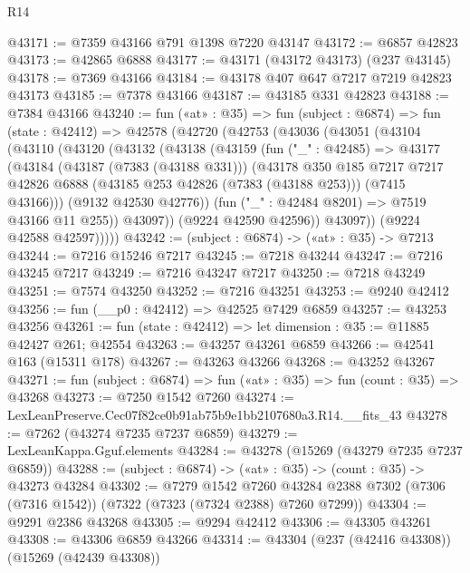 \begin{lexlean}{R14}
\begin{coremodule}
@43171 := @7359 @43166 @791 @1398 @7220 @43147
@43172 := @6857 @42823
@43173 := @42865 @6888
@43177 := @43171 (@43172 @43173) (@237 @43145)
@43178 := @7369 @43166
@43184 := @43178 @407 @647 @7217 @7219 @42823 @43173
@43185 := @7378 @43166
@43187 := @43185 @331 @42823
@43188 := @7384 @43166
@43240 := fun («at» : @35) =>
  fun (subject : @6874) =>
  fun (state : @42412) =>
  @42578
    (@42720
      (@42753
        (@43036
          (@43051
            (@43104
              (@43110
                (@43120
                  (@43132
                    (@43138
                      (@43159
                        (fun ("_" : @42485) =>
                        @43177
                          (@43184
                            (@43187 (@7383 (@43188 @331)))
                            (@43178
                              @350
                              @185
                              @7217
                              @7217
                              @42826
                              @6888
                              (@43185 @253 @42826 (@7383 (@43188 @253)))
                              (@7415 @43166)))
                          (@9132 @42530 @42776))
                        (fun ("_" : @42484 @8201) => @7519 @43166 @11 @255))
                      @43097))
                  (@9224 @42590 @42596))
                @43097))
            (@9224 @42588 @42597)))))
@43242 := (subject : @6874) -> («at» : @35) -> @7213
@43244 := @7216 @15246 @7217
@43245 := @7218 @43244
@43247 := @7216 @43245 @7217
@43249 := @7216 @43247 @7217
@43250 := @7218 @43249
@43251 := @7574 @43250
@43252 := @7216 @43251
@43253 := @9240 @42412
@43256 := fun (__p0 : @42412) => @42525 @7429 @6859
@43257 := @43253 @43256
@43261 := fun (state : @42412) => let dimension : @35 := @11885 @42427 @261; @42554
@43263 := @43257 @43261 @6859
@43266 := @42541 @163 (@15311 @178)
@43267 := @43263 @43266
@43268 := @43252 @43267
@43271 := fun (subject : @6874) => fun («at» : @35) => fun (count : @35) => @43268
@43273 := @7250 @1542 @7260
@43274 := LexLeanPreserve.Cec07f82ce0b91ab75b9e1bb2107680a3.R14.__fits_43
@43278 := @7262 (@43274 @7235 @7237 @6859)
@43279 := LexLeanKappa.Gguf.elements
@43284 := @43278 (@15269 (@43279 @7235 @7237 @6859))
@43288 := (subject : @6874) -> («at» : @35) -> (count : @35) -> @43273 @43284
@43302 := @7279
    @1542
    @7260
    @43284
    @2388
    @7302
    (@7306 (@7316 @1542))
    (@7322 (@7323 (@7324 @2388) @7260 @7299))
@43304 := @9291 @2386 @43268
@43305 := @9294 @42412
@43306 := @43305 @43261
@43308 := @43306 @6859 @43266
@43314 := @43304 (@237 (@42416 @43308)) (@15269 (@42439 @43308))

\end{coremodule}
\end{lexlean}
